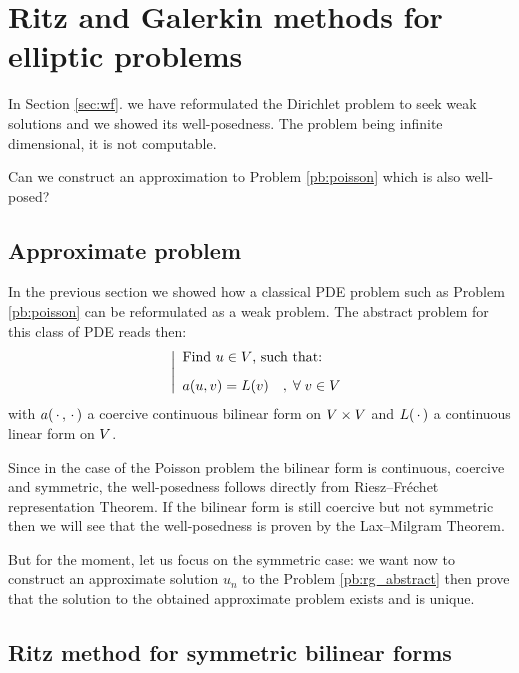 
\chapter[Ritz and Galerkin for elliptic problems]{Ritz and Galerkin methods for elliptic problems}\label{sec:rg}

In Section \ref{sec:wf}. we have reformulated the Dirichlet problem to seek weak solutions and we showed its well-posedness. The problem being infinite dimensional, it is not computable.

\medskip
\Question Can we construct an approximation to Problem \eqref{pb:poisson} which is also well-posed?

\section{Approximate problem}

In the previous section we showed how a classical PDE problem such as Problem \eqref{pb:poisson} can be reformulated as a weak problem.
The abstract problem for this class of PDE reads then:
\begin{equation}\label{pb:rg_abstract}
\left\lvert
\begin{array}{ll}
\mbox{Find $u \in {V}$, such that:}\\[2ex]
\displaystyle a( u, v ) = L(v)\quad,\;{\forall\;}  v\in {V}
\end{array}
\right .
\end{equation}
with $a(\,{\mathbf\cdot}\,,\,{\mathbf\cdot}\,)$ a coercive continuous bilinear form on ${V}\times{V}$ and $L(\,{\mathbf\cdot}\,)$ a continuous linear form on ${V}$.

\medskip
Since in the case of the Poisson problem the bilinear form is continuous, coercive and symmetric, the well-posedness follows directly from Riesz--Fréchet representation Theorem. If the bilinear form is still coercive but not symmetric then we will see that the well-posedness is proven by the Lax--Milgram Theorem.

But for the moment, let us focus on the symmetric case: we want now to construct an approximate solution $u_n$ to the Problem \eqref{pb:rg_abstract} then prove that the solution to the obtained approximate problem exists and is unique.

\section{Ritz method for symmetric bilinear forms}

